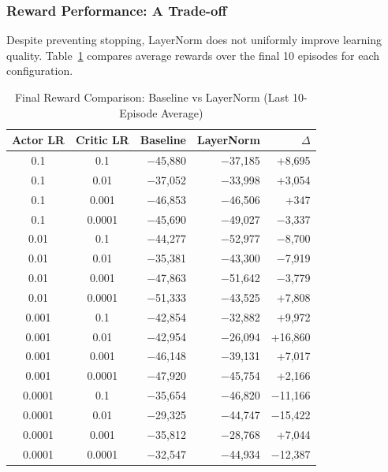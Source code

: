 \subsubsection{Reward Performance: A Trade-off}

Despite preventing stopping, LayerNorm does not uniformly improve learning quality. Table~\ref{tab:layernorm_rewards} compares average rewards over the final 10 episodes for each configuration.

\begin{table}[htbp]
\caption{Final Reward Comparison: Baseline vs LayerNorm (Last 10-Episode Average)}
\label{tab:layernorm_rewards}
\centering
\small
\begin{tabular}{ccrrr}
\toprule
\textbf{Actor LR} & \textbf{Critic LR} & \textbf{Baseline} & \textbf{LayerNorm} & \textbf{$\Delta$} \\
\midrule
0.1 & 0.1 & $-$45,880 & $-$37,185 & +8,695 \\
0.1 & 0.01 & $-$37,052 & $-$33,998 & +3,054 \\
0.1 & 0.001 & $-$46,853 & $-$46,506 & +347 \\
0.1 & 0.0001 & $-$45,690 & $-$49,027 & $-$3,337 \\
0.01 & 0.1 & $-$44,277 & $-$52,977 & $-$8,700 \\
0.01 & 0.01 & $-$35,381 & $-$43,300 & $-$7,919 \\
0.01 & 0.001 & $-$47,863 & $-$51,642 & $-$3,779 \\
0.01 & 0.0001 & $-$51,333 & $-$43,525 & +7,808 \\
0.001 & 0.1 & $-$42,854 & $-$32,882 & +9,972 \\
0.001 & 0.01 & $-$42,954 & $-$26,094 & +16,860 \\
0.001 & 0.001 & $-$46,148 & $-$39,131 & +7,017 \\
0.001 & 0.0001 & $-$47,920 & $-$45,754 & +2,166 \\
0.0001 & 0.1 & $-$35,654 & $-$46,820 & $-$11,166 \\
0.0001 & 0.01 & $-$29,325 & $-$44,747 & $-$15,422 \\
0.0001 & 0.001 & $-$35,812 & $-$28,768 & +7,044 \\
0.0001 & 0.0001 & $-$32,547 & $-$44,934 & $-$12,387 \\
\bottomrule
\end{tabular}
\end{table}

